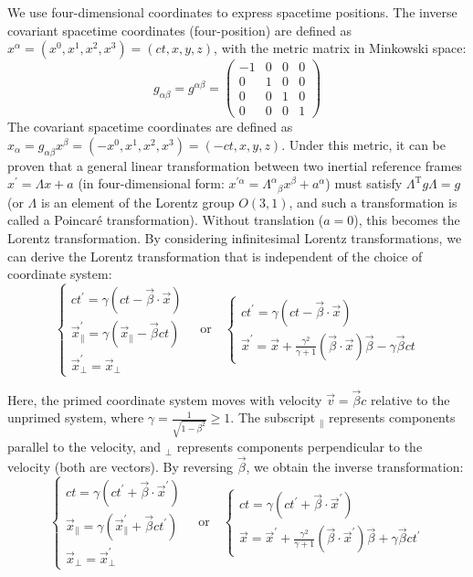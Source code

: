 \documentclass{article}
\begin{document}
We use four-dimensional coordinates to express spacetime positions. The inverse covariant spacetime coordinates (four-position) are defined as $x^{\alpha} = (x^{0}, x^{1}, x^{2}, x^{3}) = (ct, x, y, z)$, with the metric matrix in Minkowski space:
$$g_{\alpha \beta} = g^{\alpha \beta} = \begin{pmatrix} -1 & 0 & 0 & 0 \\ 0 & 1 & 0 & 0 \\ 0 & 0 & 1 & 0 \\ 0 & 0 & 0 & 1 \end{pmatrix}$$
The covariant spacetime coordinates are defined as $x_{\alpha} = g_{\alpha \beta} x^{\beta} = (-x^{0}, x^{1}, x^{2}, x^{3}) = (-ct, x, y, z)$. Under this metric, it can be proven that a general linear transformation between two inertial reference frames $x^{'} = \Lambda x + a$ (in four-dimensional form: $x^{'\alpha} = {\Lambda^{\alpha}}_{\beta} x^{\beta} + a^{\alpha}$) must satisfy $\Lambda^{\mathrm{T}} g \Lambda = g$ (or $\Lambda$ is an element of the Lorentz group $O(3,1)$, and such a transformation is called a Poincaré transformation). Without translation ($a = 0$), this becomes the Lorentz transformation. By considering infinitesimal Lorentz transformations, we can derive the Lorentz transformation that is independent of the choice of coordinate system:
$$ \begin{cases} ct^{'} = \gamma (ct - \vec{\beta} \cdot \vec{x}) \\ \vec{x}^{'}_{\parallel} = \gamma (\vec{x}_{\parallel} - \vec{\beta} ct) \\ \vec{x}^{'}_{\perp} = \vec{x}_{\perp} \end{cases} \quad \text{or} \quad \begin{cases} ct^{'} = \gamma (ct - \vec{\beta} \cdot \vec{x}) \\ \vec{x}^{'} = \vec{x} + \frac{\gamma^2} {\gamma + 1} (\vec{\beta} \cdot \vec{x}) \vec{\beta} - \gamma \vec{\beta} ct \end{cases} $$

Here, the primed coordinate system moves with velocity $\vec{v} = \vec{\beta} c$ relative to the unprimed system, where $\gamma = \frac{1} {\sqrt{1 - \beta^2}} \geq 1$. The subscript $_{\parallel}$ represents components parallel to the velocity, and $_{\perp}$ represents components perpendicular to the velocity (both are vectors). By reversing $\vec{\beta}$, we obtain the inverse transformation:
$$ \begin{cases} ct = \gamma (ct^{'} + \vec{\beta} \cdot \vec{x}^{'}) \\ \vec{x}_{\parallel} = \gamma (\vec{x}^{'}_{\parallel} + \vec{\beta} ct^{'}) \\ \vec{x}_{\perp} = \vec{x}^{'}_{\perp} \end{cases} \quad \text{or} \quad \begin{cases} ct = \gamma (ct^{'} + \vec{\beta} \cdot \vec{x}^{'}) \\ \vec{x} = \vec{x}^{'} + \frac{\gamma^2} {\gamma + 1} (\vec{\beta} \cdot \vec{x}^{'}) \vec{\beta} + \gamma \vec{\beta} ct^{'} \end{cases} $$
\end{document}
